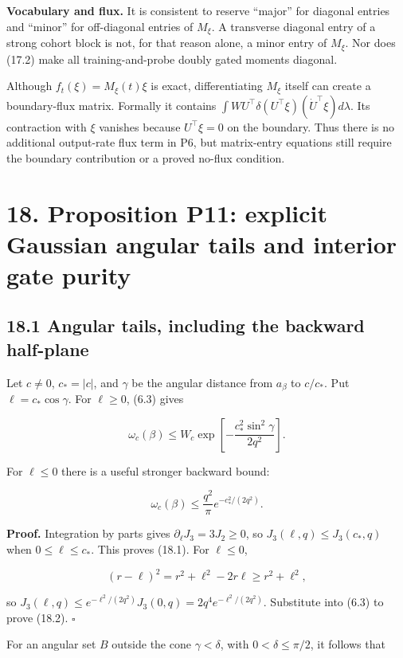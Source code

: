 \documentclass[
  10pt,
]{article}
\begin{document}
\textbf{Vocabulary and flux.} It is consistent to reserve ``major'' for
diagonal entries and ``minor'' for off-diagonal entries of \(M_\xi\). A
transverse diagonal entry of a strong cohort block is not, for that
reason alone, a minor entry of \(M_\xi\). Nor does (17.2) make all
training-and-probe doubly gated moments diagonal.

Although \(f_t(\xi)=M_\xi(t)\xi\) is exact, differentiating \(M_\xi\)
itself can create a boundary-flux matrix. Formally it contains
\(\int WU^\top\delta(U^\top\xi)(\dot U^\top\xi)d\lambda\). Its
contraction with \(\xi\) vanishes because \(U^\top\xi=0\) on the
boundary. Thus there is no additional output-rate flux term in P6, but
matrix-entry equations still require the boundary contribution or a
proved no-flux condition.

\section{18. Proposition P11: explicit Gaussian angular tails and
interior gate
purity}\label{proposition-p11-explicit-gaussian-angular-tails-and-interior-gate-purity}

\subsection{18.1 Angular tails, including the backward
half-plane}\label{angular-tails-including-the-backward-half-plane}

Let \(c\ne0\), \(c_*=|c|\), and \(\gamma\) be the angular distance from
\(a_\beta\) to \(c/c_*\). Put \(\ell=c_*\cos\gamma\). For \(\ell\ge0\),
(6.3) gives

\[
 \omega_c(\beta)\le W_c
 \exp\left[-\frac{c_*^2\sin^2\gamma}{2q^2}\right].
 \tag{18.1}
\]

For \(\ell\le0\) there is a useful stronger backward bound:

\[
 \omega_c(\beta)\le\frac{q^2}{\pi}
                 e^{-c_*^2/(2q^2)}.
 \tag{18.2}
\]

\textbf{Proof.} Integration by parts gives
\(\partial_\ell J_3=3J_2\ge0\), so \(J_3(\ell,q)\le J_3(c_*,q)\) when
\(0\le\ell\le c_*\). This proves (18.1). For \(\ell\le0\),

\[
 (r-\ell)^2=r^2+\ell^2-2r\ell\ge r^2+\ell^2,
\]

so \(J_3(\ell,q)\le e^{-\ell^2/(2q^2)}J_3(0,q)=2q^4e^{-\ell^2/(2q^2)}\).
Substitute into (6.3) to prove (18.2). \(\square\)

For an angular set \(B\) outside the cone \(\gamma<\delta\), with
\(0<\delta\le\pi/2\), it follows that
\end{document}
